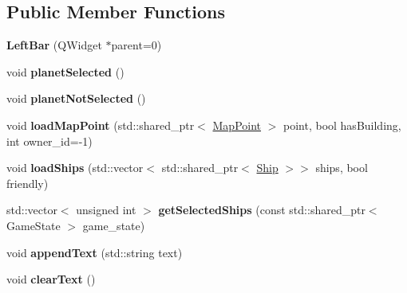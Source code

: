 \subsection*{Public Member Functions}
\begin{DoxyCompactItemize}
\item 
{\bfseries Left\+Bar} (Q\+Widget $\ast$parent=0)\hypertarget{classLeftBar_af92e99cffc3f857048efa828ef168275}{}\label{classLeftBar_af92e99cffc3f857048efa828ef168275}

\item 
void {\bfseries planet\+Selected} ()\hypertarget{classLeftBar_afaa039120f8bb8f02f856a14ac677df3}{}\label{classLeftBar_afaa039120f8bb8f02f856a14ac677df3}

\item 
void {\bfseries planet\+Not\+Selected} ()\hypertarget{classLeftBar_af56038978c9a47606012abc0cd4dff2b}{}\label{classLeftBar_af56038978c9a47606012abc0cd4dff2b}

\item 
void {\bfseries load\+Map\+Point} (std\+::shared\+\_\+ptr$<$ \hyperlink{classMapPoint}{Map\+Point} $>$ point, bool has\+Building, int owner\+\_\+id=-\/1)\hypertarget{classLeftBar_a57f401cc62c899fc3c3559d8954256c1}{}\label{classLeftBar_a57f401cc62c899fc3c3559d8954256c1}

\item 
void {\bfseries load\+Ships} (std\+::vector$<$ std\+::shared\+\_\+ptr$<$ \hyperlink{classShip}{Ship} $>$$>$ ships, bool friendly)\hypertarget{classLeftBar_ac767661c7f477c4b0eae7c15bd2fab0e}{}\label{classLeftBar_ac767661c7f477c4b0eae7c15bd2fab0e}

\item 
std\+::vector$<$ unsigned int $>$ {\bfseries get\+Selected\+Ships} (const std\+::shared\+\_\+ptr$<$ Game\+State $>$ game\+\_\+state)\hypertarget{classLeftBar_ae9d70c20007cfec7b5d3ab39aa68a575}{}\label{classLeftBar_ae9d70c20007cfec7b5d3ab39aa68a575}

\item 
void {\bfseries append\+Text} (std\+::string text)\hypertarget{classLeftBar_a0cf867d0d1ff61bbf965255c44c992ea}{}\label{classLeftBar_a0cf867d0d1ff61bbf965255c44c992ea}

\item 
void {\bfseries clear\+Text} ()\hypertarget{classLeftBar_ac3d2665391b2b2be7c22246719e3a276}{}\label{classLeftBar_ac3d2665391b2b2be7c22246719e3a276}

\end{DoxyCompactItemize}


